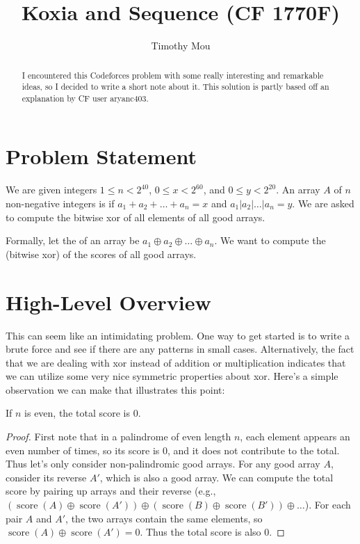 \documentclass[11pt]{scrartcl}
\DeclareMathOperator{\score}{score}
\begin{document}
\title{Koxia and Sequence (CF 1770F)}
\author{Timothy Mou}
\maketitle

\begin{abstract}
  I encountered this Codeforces problem with some really interesting and remarkable ideas, so I decided to write a short note about it.
  This solution is partly based off an explanation by CF user aryanc403.
\end{abstract}

\tableofcontents

\section{Problem Statement}

We are given integers $1 \leq n < 2^{40}$, $0 \leq x < 2^{60}$, and $0 \leq y < 2^{20}$.
An array $A$ of $n$ non-negative integers is  if
$a_1 + a_2 + \dots + a_n = x$ and 
$a_1 | a_2 | \dots | a_n = y$.
We are asked to compute the bitwise xor of all elements of all good arrays. 

Formally, let the  of an array be $a_1 \oplus a_2 \oplus \dots \oplus a_n$. We want to compute the  (bitwise xor) of the scores of all good arrays.

\section{High-Level Overview}

This can seem like an intimidating problem.
One way to get started is to write a brute force and see if there are any patterns in small cases.
Alternatively, the fact that we are dealing with xor instead of addition or multiplication indicates that we can utilize some very nice symmetric properties about xor.
Here's a simple observation we can make that illustrates this point:

\begin{lemma}
If $n$ is even, the total score is $0$.
\end{lemma}
\begin{proof}
  First note that in a palindrome of even length $n$, each element appears an even number of times, so its score is $0$, and it does not contribute to the total.
  Thus let's only consider non-palindromic good arrays.
  For any good array $A$, consider its reverse $A'$, which is also a good array.
  We can compute the total score by pairing up arrays and their reverse (e.g., $(\score(A) \oplus \score(A')) \oplus (\score(B) \oplus \score(B')) \oplus \dots$).
  For each pair $A$ and $A'$, the two arrays contain the same elements, so $\score(A) \oplus \score(A') = 0$.
  Thus the total score is also $0$.
\end{proof}
\end{document}
